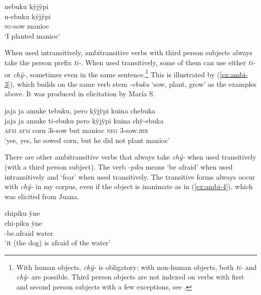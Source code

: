\ea\label{ex:ambi-2}
\begingl
\glpreamble nebuku kÿjÿpi\\
\gla n-ebuku kÿjÿpi\\
\textsc{sg}-sow manioc\\
\glft ‘I planted manioc’
\endgl
\trailingcitation{[mxx-n101017s-2.017]}
\xe


When used intransitively, ambitransitive verbs with third person subjects always take the person prefix \textit{ti-}. When used transitively, some of them can use either \textit{ti-} or \textit{chÿ-}, sometimes even in the same sentence.\footnote{With human objects, \textit{chÿ-} is obligatory; with non-human objects, both \textit{ti-} and \textit{chÿ-} are possible. Third person objects are not indexed on verbs with first and second person subjects with a few exceptions, see .} This is illustrated by (\ref{ex:ambi-3}), which builds on the same verb stem \textit{-ebuku} ‘sow, plant, grow’ as the examples above. It was produced in elicitation by María S.

\ea\label{ex:ambi-3}
\begingl
\glpreamble jaja ja amuke tebuku, pero kÿjÿpi kuina chebuka\\
\gla jaja ja amuke ti-ebuku pero kÿjÿpi kuina chÿ-ebuka\\
\glb \textsc{afm} \textsc{afm} corn 3i-sow but manioc \textsc{neg} 3-sow.\textsc{irr}\\
\glft ‘yes, yes, he sowed corn, but he did not plant manioc’
\endgl
\trailingcitation{[rxx-e181024l]}%
\xe

There are other ambitransitive verbs that always take \textit{chÿ-} when used transitively (with a third person subject). The verb \textit{-piku} means ‘be afraid’ when used intransitively and ‘fear’ when used transitively. The transitive forms always occur with \textit{chÿ-} in my corpus, even if the object is inanimate as in (\ref{ex:ambi-4}), which was elicited from Juana.

\ea\label{ex:ambi-4}
\begingl
\glpreamble chipiku ÿne\\
\gla chi-piku ÿne\\
-be.afraid water\\
\glft ‘it (the dog) is afraid of the water’
\endgl
\trailingcitation{[jxx-a120516l-a.376]}%
\xe

